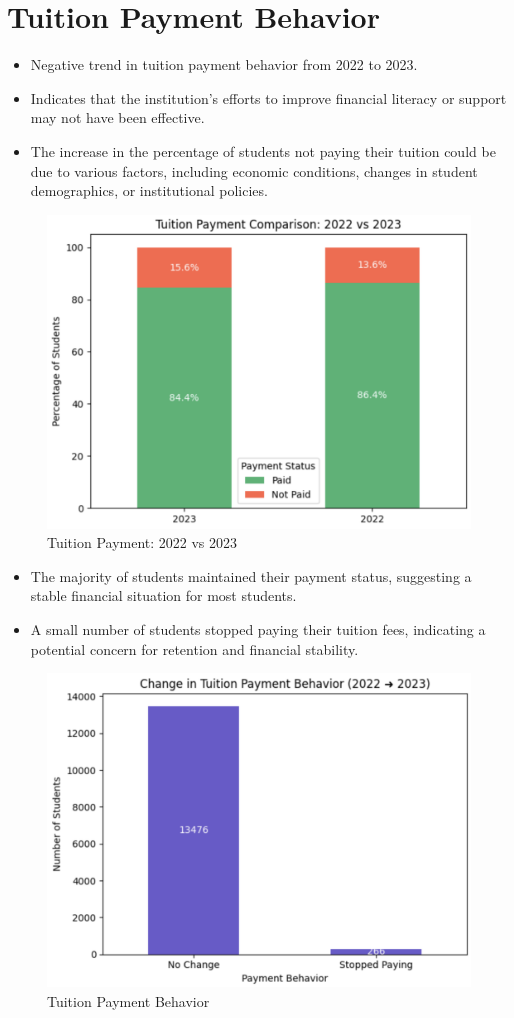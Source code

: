 \documentclass[12pt]{article}
\begin{document}
\section{Tuition Payment Behavior}

\begin{itemize}
    \item Negative trend in tuition payment behavior from 2022 to 2023.
    \item Indicates that the institution's efforts to improve financial literacy or support may not have been effective.
    \item The increase in the percentage of students not paying their tuition could be due to various factors, including economic conditions, changes in student demographics, or institutional policies.
\end{itemize}

\begin{figure}[H]
    \centering
    \includegraphics[width=0.7\linewidth]{tuition_payment.png}
    \caption{Tuition Payment: 2022 vs 2023}
\end{figure}

\begin{itemize}
    \item The majority of students maintained their payment status, suggesting a stable financial situation for most students.
    \item A small number of students stopped paying their tuition fees, indicating a potential concern for retention and financial stability.
\end{itemize}

\begin{figure}[H]
    \centering
    \includegraphics[width=0.7\linewidth]{change_in_tuition_payment.png}
    \caption{Tuition Payment Behavior}
\end{figure}
\end{document}
